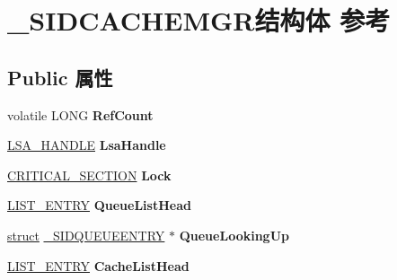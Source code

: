 \hypertarget{struct___s_i_d_c_a_c_h_e_m_g_r}{}\section{\+\_\+\+S\+I\+D\+C\+A\+C\+H\+E\+M\+G\+R结构体 参考}
\label{struct___s_i_d_c_a_c_h_e_m_g_r}
\subsection*{Public 属性}
\begin{DoxyCompactItemize}
\item 
\mbox{\label{struct___s_i_d_c_a_c_h_e_m_g_r_a811dd27df0f86e22dd26d012c6054ad5}} 
volatile L\+O\+NG {\bfseries Ref\+Count}
\item 
\mbox{\label{struct___s_i_d_c_a_c_h_e_m_g_r_ab70969ea39728a13ce71a3bc934752db}} 
\hyperlink{interfacevoid}{L\+S\+A\+\_\+\+H\+A\+N\+D\+LE} {\bfseries Lsa\+Handle}
\item 
\mbox{\label{struct___s_i_d_c_a_c_h_e_m_g_r_aa6dc4e580c66306c308ab61736b78291}} 
\hyperlink{struct___c_r_i_t_i_c_a_l___s_e_c_t_i_o_n}{C\+R\+I\+T\+I\+C\+A\+L\+\_\+\+S\+E\+C\+T\+I\+ON} {\bfseries Lock}
\item 
\mbox{\label{struct___s_i_d_c_a_c_h_e_m_g_r_a65a4b27e5ff7b47f2d1e313a7cbdfdb2}} 
\hyperlink{struct___l_i_s_t___e_n_t_r_y}{L\+I\+S\+T\+\_\+\+E\+N\+T\+RY} {\bfseries Queue\+List\+Head}
\item 
\mbox{\label{struct___s_i_d_c_a_c_h_e_m_g_r_a1acad736ecdf85ed1e3934092239e4e0}} 
\hyperlink{interfacestruct}{struct} \hyperlink{struct___s_i_d_q_u_e_u_e_e_n_t_r_y}{\+\_\+\+S\+I\+D\+Q\+U\+E\+U\+E\+E\+N\+T\+RY} $\ast$ {\bfseries Queue\+Looking\+Up}
\item 
\mbox{\label{struct___s_i_d_c_a_c_h_e_m_g_r_ac602fd6d7bb34a3dcfd56f2f2d1de5c7}} 
\hyperlink{struct___l_i_s_t___e_n_t_r_y}{L\+I\+S\+T\+\_\+\+E\+N\+T\+RY} {\bfseries Cache\+List\+Head}
\item 
\mbox{\label{struct___s_i_d_c_a_c_h_e_m_g_r_adbc7b34bd62bd6fe69645cacd6021bb2}} 

\end{DoxyCompactItemize}
